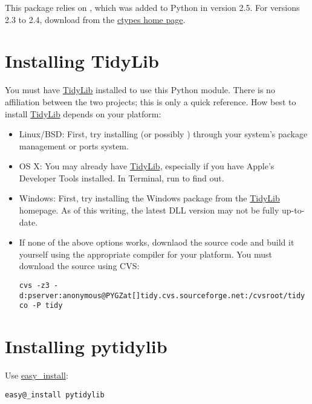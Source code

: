 \documentclass[letterpaper,10pt,english]{howto}
\begin{document}
This package relies on , which was added to Python in version 2.5. For versions 2.3 to 2.4, download  from the \href{http://python.net/crew/theller/ctypes/}{ctypes home page}.


\section{Installing TidyLib}

You must have \href{http://tidy.sourceforge.net/}{TidyLib} installed to use this Python module. There is no affiliation between the two projects; this is only a quick reference. How best to install \href{http://tidy.sourceforge.net/}{TidyLib} depends on your platform:
\begin{itemize}
\item {} 
Linux/BSD: First, try installing  (or possibly ) through your system's package management or ports system.

\item {} 
OS X: You may already have \href{http://tidy.sourceforge.net/}{TidyLib}, especially if you have Apple's Developer Tools installed. In Terminal, run  to find out.

\item {} 
Windows: First, try installing the Windows package from the \href{http://tidy.sourceforge.net/}{TidyLib} homepage. As of this writing, the latest DLL version may not be fully up-to-date.

\item {} 
If none of the above options works, downlaod the source code and build it yourself using the appropriate compiler for your platform. You must download the source using CVS:

\begin{Verbatim}[commandchars=@\[\]]
cvs -z3 -d:pserver:anonymous@PYGZat[]tidy.cvs.sourceforge.net:/cvsroot/tidy co -P tidy
\end{Verbatim}

\end{itemize}


\section{Installing pytidylib}

Use \href{http://peak.telecommunity.com/DevCenter/EasyInstall}{easy\_install}:

\begin{Verbatim}[commandchars=@\[\]]
easy@_install pytidylib
\end{Verbatim}
\end{document}
